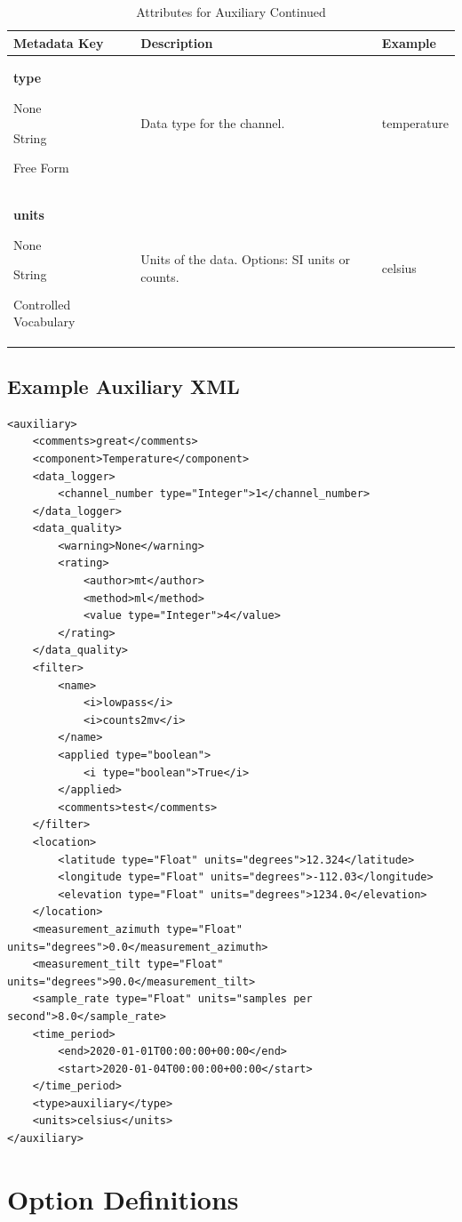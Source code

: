 \documentclass[12pt]{article}
\newcommand{\True}[0]{{\color{Red}{\textbf{True}}}}
\newcommand{\entry}[7]{
	\textbf{#1} 
	\begin{itemize}[topsep=5pt,itemsep=-.1pt,parsep=-2pt,partopsep=0pt,labelwidth=2em,align=left,itemindent=1em]
		\begin{small}
			\item[Required:] #2
			\item[Units:] #3
			\item[Type:] #4
			\item[Style:] #5
		\end{small}
	\end{itemize} & #6 & #7 \\ \midrule}
\begin{document}
\clearpage
\newpage
\begin{table}[h!]
	\caption*{Attributes for Auxiliary  Continued}
	\begin{tabular}{p{}>{\raggedright}p{}>{\raggedright\arraybackslash}p{}}
		\textbf{Metadata Key} & \textbf{Description} & \textbf{Example} \\ \toprule
		\entry{type}{\True}{None}{String}{Free Form}{Data type for the channel.}{temperature}
		\entry{units}{\True}{None}{String}{Controlled Vocabulary}{Units of the data.  Options: SI units or counts.}{celsius}
	\end{tabular}
\end{table}


\newpage
\subsection{Example Auxiliary XML} 

\begin{verbatim}
<auxiliary>
    <comments>great</comments>
    <component>Temperature</component>
    <data_logger>
        <channel_number type="Integer">1</channel_number>
    </data_logger>
    <data_quality>
        <warning>None</warning>
        <rating>
            <author>mt</author>
            <method>ml</method>
            <value type="Integer">4</value>
        </rating>
    </data_quality>
    <filter>
        <name>
            <i>lowpass</i>
            <i>counts2mv</i>
        </name>
        <applied type="boolean">
            <i type="boolean">True</i>
        </applied>
        <comments>test</comments>
    </filter>
    <location>
        <latitude type="Float" units="degrees">12.324</latitude>
        <longitude type="Float" units="degrees">-112.03</longitude>
        <elevation type="Float" units="degrees">1234.0</elevation>
    </location>
    <measurement_azimuth type="Float" units="degrees">0.0</measurement_azimuth>
    <measurement_tilt type="Float" units="degrees">90.0</measurement_tilt>
    <sample_rate type="Float" units="samples per second">8.0</sample_rate>
    <time_period>
        <end>2020-01-01T00:00:00+00:00</end>
        <start>2020-01-04T00:00:00+00:00</start>
    </time_period>
    <type>auxiliary</type>
    <units>celsius</units>
</auxiliary>
\end{verbatim}

\newpage
\appendix
\section{Option Definitions}
\label{appendix}
\end{document}
